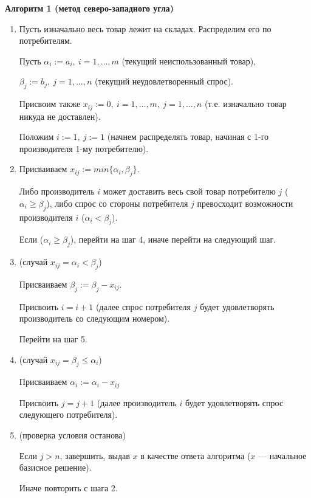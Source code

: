 \documentclass[12pt]{article}
\theoremstyle{definition}
\theoremstyle{plain}
\theoremstyle{definition}
\begin{document}
\noindent\textbf{Алгоритм 1 (метод северо-западного угла)}\label{alg:1}
\makeatletter
\def\@currentlabel{1}\label{alg:1}
\makeatother
\begin{enumerate}[label=\textbf{\arabic*.}]

    \item Пусть изначально весь товар лежит на складах. Распределим его по потребителям.

    Пусть $\alpha_i := a_i,\: i =1,\dots,m$ (текущий неиспользованный товар),
  
    $\beta_j := b_j, \: j =1,\dots,n$ (текущий неудовлетворенный спрос).

    Присвоим также $x_{ij} := 0, \: i =1,\dots,m, \: j =1,\dots,n$ (т.е. изначально товар никуда не доставлен).

    Положим $i := 1, \: j := 1$ (начнем распределять товар, начиная с 1-го производителя 1-му потребителю).

    \item Присваиваем $x_{ij} := min\{\alpha_i, \beta_j\}$.
    
    Либо производитель $i$ может доставить весь свой товар потребителю $j$
    ($\alpha_i \geq \beta_j$), либо спрос со стороны потребителя $j$ превосходит возможности
    производителя $i$ ($\alpha_i < \beta_j$).

    Если ($\alpha_i \geq \beta_j$), перейти на шаг 4, иначе перейти на следующий шаг.
  
    \item (случай $x_{ij} = \alpha_i < \beta_j$)

    Присваиваем $\beta_j := \beta_j - x_{ij}$.
    
    Присвоить $i = i + 1$ (далее спрос потребителя $j$ будет удовлетворять производитель со следующим номером).
    
    Перейти на шаг 5.

    \item (случай $x_{ij} = \beta_j \leq \alpha_i$)
    
    Присваиваем $\alpha_i := \alpha_i - x_{ij}$
    
    Присвоить $j = j + 1$ (далее производитель $i$ будет удовлетворять спрос следующего потребителя).
    
    \item (проверка условия останова)
    
    Если $j > n$, завершить, выдав $x$ в качестве ответа алгоритма ($x$ --- начальное базисное решение).

    Иначе повторить с шага 2.

\end{enumerate}
\end{document}
